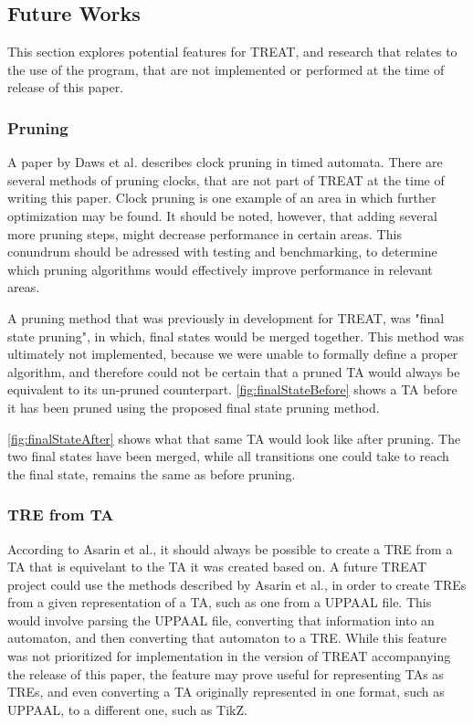 \subsection{Future Works}\label{subsec:futureWorks}
This section explores potential features for TREAT, and research that relates to the use of the program, that are not implemented or performed at the time of release of this paper.

\subsubsection{Pruning}\label{futureWorks:pruning}
A paper by Daws et al. \cite{Daws1996} describes clock pruning in timed automata. There are several methods of pruning clocks, that are not part of TREAT at the time of writing this paper.
Clock pruning is one example of an area in which further optimization may be found. It should be noted, however, that adding several more pruning steps, might decrease performance in certain areas.
This conundrum should be adressed with testing and benchmarking, to determine which pruning algorithms would effectively improve performance in relevant areas.

A pruning method that was previously in development for TREAT, was "final state pruning", in which, final states would be merged together. This method was ultimately not implemented, because we were unable to formally define a proper algorithm, and therefore could not be certain that a pruned TA would always be equivalent to its un-pruned counterpart.
\cref{fig:finalStateBefore} shows a TA before it has been pruned using the proposed final state pruning method.



\cref{fig:finalStateAfter} shows what that same TA would look like after pruning. The two final states have been merged, while all transitions one could take to reach the final state, remains the same as before pruning.




\subsubsection{TRE from TA}
According to Asarin et al.\cite{Eugene2001}, it should always be possible to create a TRE from a TA that is equivelant to the TA it was created based on.
A future TREAT project could use the methods described by Asarin et al., in order to create TREs from a given representation of a TA, such as one from a UPPAAL file.
This would involve parsing the UPPAAL file, converting that information into an automaton, and then converting that automaton to a TRE.
While this feature was not prioritized for implementation in the version of TREAT accompanying the release of this paper, the feature may prove useful for representing TAs as TREs, and even converting a TA originally represented in one format, such as UPPAAL, to a different one, such as TikZ.

